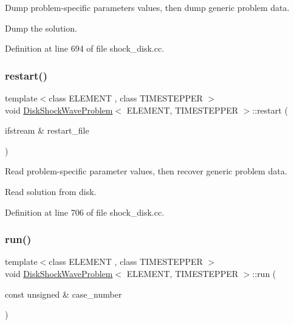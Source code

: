 Dump problem-\/specific parameters values, then dump generic problem data. 

Dump the solution. 

Definition at line 694 of file shock\+\_\+disk.\+cc.

\mbox{\label{classDiskShockWaveProblem_ae883625e9bbe6ea442413f7c970d3fb1}} 
\subsubsection{\texorpdfstring{restart()}{restart()}}
{\footnotesize\ttfamily template$<$class E\+L\+E\+M\+E\+NT , class T\+I\+M\+E\+S\+T\+E\+P\+P\+ER $>$ \\
void \hyperlink{classDiskShockWaveProblem}{Disk\+Shock\+Wave\+Problem}$<$ E\+L\+E\+M\+E\+NT, T\+I\+M\+E\+S\+T\+E\+P\+P\+ER $>$\+::restart (\begin{DoxyParamCaption}\item[{ifstream \&}]{restart\+\_\+file }\end{DoxyParamCaption})}



Read problem-\/specific parameter values, then recover generic problem data. 

Read solution from disk. 

Definition at line 706 of file shock\+\_\+disk.\+cc.

\mbox{\label{classDiskShockWaveProblem_af8dc3befd3eba59b008c315bfe077340}} 
\subsubsection{\texorpdfstring{run()}{run()}}
{\footnotesize\ttfamily template$<$class E\+L\+E\+M\+E\+NT , class T\+I\+M\+E\+S\+T\+E\+P\+P\+ER $>$ \\
void \hyperlink{classDiskShockWaveProblem}{Disk\+Shock\+Wave\+Problem}$<$ E\+L\+E\+M\+E\+NT, T\+I\+M\+E\+S\+T\+E\+P\+P\+ER $>$\+::run (\begin{DoxyParamCaption}\item[{const unsigned \&}]{case\+\_\+number }\end{DoxyParamCaption})}



